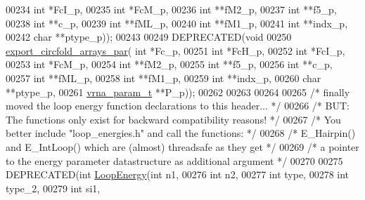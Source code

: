 \begin{DoxyCode}
00234                         \textcolor{keywordtype}{int} *FcI\_p,
00235                         \textcolor{keywordtype}{int} *FcM\_p,
00236                         \textcolor{keywordtype}{int} **fM2\_p,
00237                         \textcolor{keywordtype}{int} **f5\_p,
00238                         \textcolor{keywordtype}{int} **c\_p,
00239                         \textcolor{keywordtype}{int} **fML\_p,
00240                         \textcolor{keywordtype}{int} **fM1\_p,
00241                         \textcolor{keywordtype}{int} **indx\_p,
00242                         \textcolor{keywordtype}{char} **ptype\_p));
00243 
00249 DEPRECATED(\textcolor{keywordtype}{void}
00250 \hyperlink{group__mfe__fold__single_ga004bb901e7fd2f8d5ae68f9530318ce1}{export\_circfold\_arrays\_par}( \textcolor{keywordtype}{int} *Fc\_p,
00251                             \textcolor{keywordtype}{int} *FcH\_p,
00252                             \textcolor{keywordtype}{int} *FcI\_p,
00253                             \textcolor{keywordtype}{int} *FcM\_p,
00254                             \textcolor{keywordtype}{int} **fM2\_p,
00255                             \textcolor{keywordtype}{int} **f5\_p,
00256                             \textcolor{keywordtype}{int} **c\_p,
00257                             \textcolor{keywordtype}{int} **fML\_p,
00258                             \textcolor{keywordtype}{int} **fM1\_p,
00259                             \textcolor{keywordtype}{int} **indx\_p,
00260                             \textcolor{keywordtype}{char} **ptype\_p,
00261                             \hyperlink{group__energy__parameters_structvrna__param__s}{vrna\_param\_t} **P\_p));
00262 
00263 
00264 
00265 \textcolor{comment}{/* finally moved the loop energy function declarations to this header...  */}
00266 \textcolor{comment}{/* BUT: The functions only exist for backward compatibility reasons!      */}
00267 \textcolor{comment}{/* You better include "loop\_energies.h" and call the functions:           */}
00268 \textcolor{comment}{/* E\_Hairpin() and E\_IntLoop() which are (almost) threadsafe as they get  */}
00269 \textcolor{comment}{/* a pointer to the energy parameter datastructure as additional argument */}
00270 
00275 DEPRECATED(\textcolor{keywordtype}{int} \hyperlink{group__mfe__fold__single_ga2163034a25c6115d894b199e97e03f6c}{LoopEnergy}(\textcolor{keywordtype}{int} n1,
00276                           \textcolor{keywordtype}{int} n2,
00277                           \textcolor{keywordtype}{int} type,
00278                           \textcolor{keywordtype}{int} type\_2,
00279                           \textcolor{keywordtype}{int} si1,

\end{DoxyCode}

